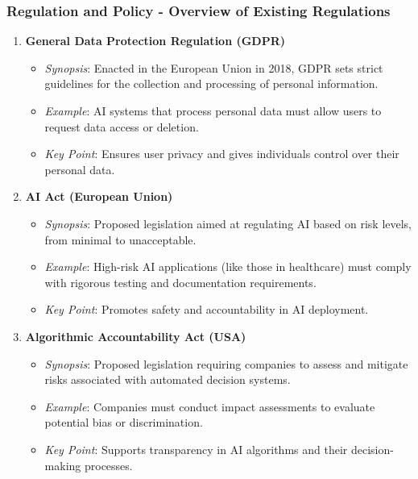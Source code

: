 \documentclass[aspectratio=169]{beamer}
\begin{document}
\begin{frame}[fragile]
    \frametitle{Regulation and Policy - Overview of Existing Regulations}
    \begin{enumerate}
        \item \textbf{General Data Protection Regulation (GDPR)}
            \begin{itemize}
                \item \textit{Synopsis}: Enacted in the European Union in 2018, GDPR sets strict guidelines for the collection and processing of personal information.
                \item \textit{Example}: AI systems that process personal data must allow users to request data access or deletion.
                \item \textit{Key Point}: Ensures user privacy and gives individuals control over their personal data.
            \end{itemize}
        
        \item \textbf{AI Act (European Union)}
            \begin{itemize}
                \item \textit{Synopsis}: Proposed legislation aimed at regulating AI based on risk levels, from minimal to unacceptable.
                \item \textit{Example}: High-risk AI applications (like those in healthcare) must comply with rigorous testing and documentation requirements.
                \item \textit{Key Point}: Promotes safety and accountability in AI deployment.
            \end{itemize}
        
        \item \textbf{Algorithmic Accountability Act (USA)}
            \begin{itemize}
                \item \textit{Synopsis}: Proposed legislation requiring companies to assess and mitigate risks associated with automated decision systems.
                \item \textit{Example}: Companies must conduct impact assessments to evaluate potential bias or discrimination.
                \item \textit{Key Point}: Supports transparency in AI algorithms and their decision-making processes.
            \end{itemize}
    \end{enumerate}
\end{frame}
\end{document}
